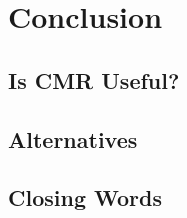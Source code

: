 \chapter{Conclusion}
\lorem{}

\section{Is CMR Useful?}
\lorem{}

\section{Alternatives}
\lorem{}

\section{Closing Words}
\lorem{}
